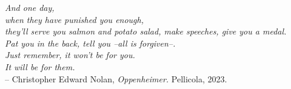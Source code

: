 \thispagestyle{empty}
\begin{flushright}
    \emph{And one day,\\
    when they have punished you enough,\\
    they'll serve you salmon and potato salad, make speeches, give you a medal.\\
    Pat you in the back, tell you --all is forgiven--. \\
    Just remember, it won't be for you.\\ It will be for them.\\}
    \vspace{1cm}
    -- Christopher Edward Nolan, \emph{Oppenheimer.}
    Pellicola, 2023.
\end{flushright}
